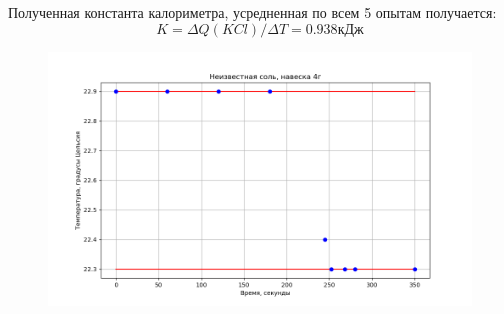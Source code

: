 \documentclass[a4paper, 12pt]{article}
\begin{document}
Полученная константа калориметра, усредненная по всем 5 опытам получается:
\[
K = \Delta Q(KCl)/\Delta T = 0.938 \text{кДж}
\]
\begin{figure}[h!]
    \centering
    \includegraphics[width=150mm]{./pictures/u1.png}
    \caption{}
\end{figure}
\end{document}
